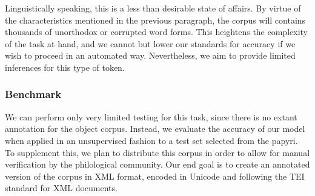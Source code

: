 Linguistically speaking, this is a less than desirable state of
affairs. By virtue of the characteristics mentioned in the previous
paragraph, the corpus will contains thousands of unorthodox or
corrupted word forms. This heightens the complexity of the task at
hand, and we cannot but lower our standards for accuracy if we wish to
proceed in an automated way. Nevertheless, we aim to provide
limited inferences for this type of token.

\subsubsection{Benchmark}
We can perform only very limited testing for this task, since there is
no extant annotation for the object corpus. Instead, we evaluate the
accuracy of our model when applied in an unsupervised fashion to a
test set selected from the papyri. To supplement this, we plan to
distribute this corpus in order to allow for manual verification by
the philological community. Our end goal is to create an annotated
version of the corpus in XML format, encoded in Unicode and following
the TEI standard for XML documents.





